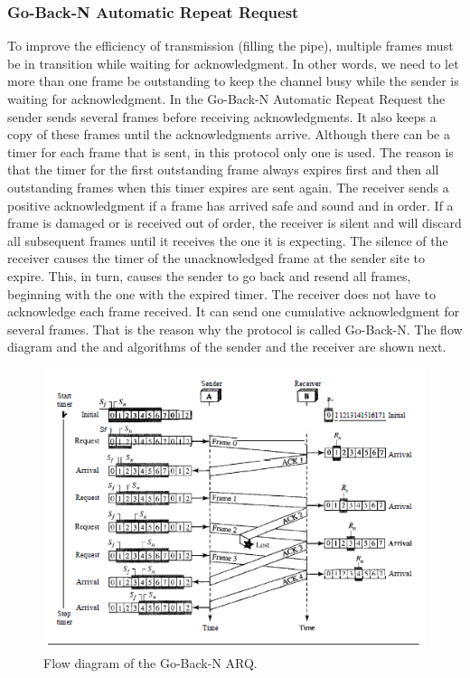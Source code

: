 \subsubsection{Go-Back-N Automatic Repeat Request}
To improve the efficiency of transmission (filling the pipe), multiple frames must be in
transition while waiting for acknowledgment. In other words, we need to let more than
one frame be outstanding to keep the channel busy while the sender is waiting for
acknowledgment. In the Go-Back-N Automatic Repeat Request the sender sends several frames before receiving acknowledgments. It also keeps a copy of these frames until the acknowledgments
arrive. Although there can be a timer for each frame that is sent, in this protocol only one is used. The reason is that the timer for the first outstanding frame always expires first and then all outstanding frames when this timer expires are sent again. The receiver sends a positive acknowledgment if a frame has arrived safe and sound
and in order. If a frame is damaged or is received out of order, the receiver is silent and
will discard all subsequent frames until it receives the one it is expecting. The silence of
the receiver causes the timer of the unacknowledged frame at the sender site to expire.
This, in turn, causes the sender to go back and resend all frames, beginning with the one
with the expired timer. The receiver does not have to acknowledge each frame received.
It can send one cumulative acknowledgment for several frames. That is the reason why the protocol is called Go-Back-N. The flow diagram and the and algorithms of the sender and the receiver are shown next. 
\begin{figure}[H]
\begin{center}
\includegraphics[scale=1]{diagramN.PNG}  
\caption{Flow diagram of the Go-Back-N ARQ.}
\end{center}
\end{figure} 
